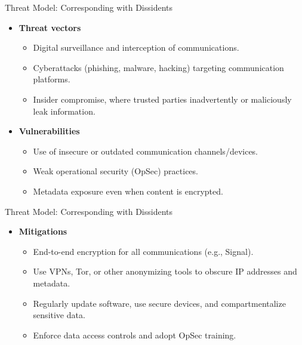 \documentclass[aspectratio=169]{beamer}
\begin{document}
\begin{frame}{Threat Model: Corresponding with Dissidents}
  \begin{itemize}
    \item[]\textbf{Threat vectors}
      \begin{itemize}
        \item Digital surveillance and interception of communications.
        \item Cyberattacks (phishing, malware, hacking) targeting communication platforms.
        \item Insider compromise, where trusted parties inadvertently or maliciously leak information.
      \end{itemize}
    \item[] \textbf{Vulnerabilities}
      \begin{itemize}
        \item Use of insecure or outdated communication channels/devices.
        \item Weak operational security (OpSec) practices.
        \item Metadata exposure even when content is encrypted.
      \end{itemize}
  \end{itemize}
\end{frame}

\begin{frame}{Threat Model: Corresponding with Dissidents}
  \begin{itemize}
    \item[] \textbf{Mitigations}
      \begin{itemize}
        \item End-to-end encryption for all communications (e.g., Signal).
        \item Use VPNs, Tor, or other anonymizing tools to obscure IP addresses and metadata.
        \item Regularly update software, use secure devices, and compartmentalize sensitive data.
        \item Enforce data access controls and adopt OpSec training.
      \end{itemize}
  \end{itemize}
\end{frame}
\end{document}
